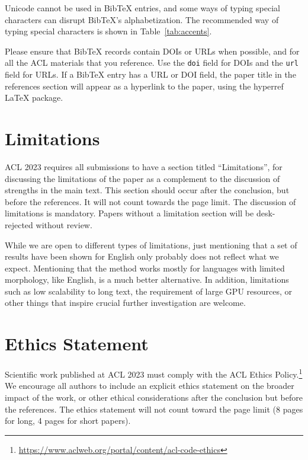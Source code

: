 \documentclass[11pt]{article}
\begin{document}
Unicode cannot be used in Bib\TeX{} entries, and some ways of typing special characters can disrupt Bib\TeX's alphabetization. The recommended way of typing special characters is shown in Table~\ref{tab:accents}.

Please ensure that Bib\TeX{} records contain DOIs or URLs when possible, and for all the ACL materials that you reference.
Use the \verb|doi| field for DOIs and the \verb|url| field for URLs.
If a Bib\TeX{} entry has a URL or DOI field, the paper title in the references section will appear as a hyperlink to the paper, using the hyperref \LaTeX{} package.

\section*{Limitations}
ACL 2023 requires all submissions to have a section titled ``Limitations'', for discussing the limitations of the paper as a complement to the discussion of strengths in the main text. This section should occur after the conclusion, but before the references. It will not count towards the page limit.
The discussion of limitations is mandatory. Papers without a limitation section will be desk-rejected without review.

While we are open to different types of limitations, just mentioning that a set of results have been shown for English only probably does not reflect what we expect. 
Mentioning that the method works mostly for languages with limited morphology, like English, is a much better alternative.
In addition, limitations such as low scalability to long text, the requirement of large GPU resources, or other things that inspire crucial further investigation are welcome.

\section*{Ethics Statement}
Scientific work published at ACL 2023 must comply with the ACL Ethics Policy.\footnote{\url{https://www.aclweb.org/portal/content/acl-code-ethics}} We encourage all authors to include an explicit ethics statement on the broader impact of the work, or other ethical considerations after the conclusion but before the references. The ethics statement will not count toward the page limit (8 pages for long, 4 pages for short papers).
\end{document}
